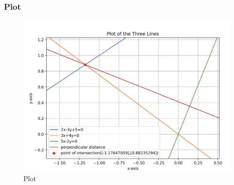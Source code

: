 \documentclass{beamer}
\begin{document}
\begin{frame}
\frametitle{Plot}
\begin{figure}[H]
    \centering
    \includegraphics[width=0.6\columnwidth]{Figs/Threelines.png}
    \caption{Plot}
    \label{fig:placeholder}
\end{figure}

\end{frame}
\end{document}
